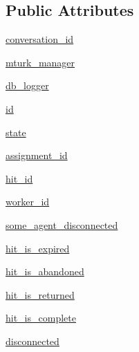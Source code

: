 \subsection*{Public Attributes}
\begin{DoxyCompactItemize}
\item 
\hyperlink{classparlai_1_1mturk_1_1core_1_1agents_1_1MTurkAgent_aa3127b5ca4b6da4227b7e7a1e79b7f48}{conversation\+\_\+id}
\item 
\hyperlink{classparlai_1_1mturk_1_1core_1_1agents_1_1MTurkAgent_ae3fddc0185f75ea64b09a86628d4a1d1}{mturk\+\_\+manager}
\item 
\hyperlink{classparlai_1_1mturk_1_1core_1_1agents_1_1MTurkAgent_ae5f9e297a7b8cc7f70286dfbb099ed64}{db\+\_\+logger}
\item 
\hyperlink{classparlai_1_1mturk_1_1core_1_1agents_1_1MTurkAgent_a88ae98b0e8133e9fff2475d09a6f2a81}{id}
\item 
\hyperlink{classparlai_1_1mturk_1_1core_1_1agents_1_1MTurkAgent_aa07fbe6a898e37332826c2d414539a34}{state}
\item 
\hyperlink{classparlai_1_1mturk_1_1core_1_1agents_1_1MTurkAgent_ada9c2a6ca3ee222f73743b2bc3a9d85f}{assignment\+\_\+id}
\item 
\hyperlink{classparlai_1_1mturk_1_1core_1_1agents_1_1MTurkAgent_a4325d1370d25335d4a7ad279d7d0c615}{hit\+\_\+id}
\item 
\hyperlink{classparlai_1_1mturk_1_1core_1_1agents_1_1MTurkAgent_a88699f19c4c7e658ae0424062cbb9d80}{worker\+\_\+id}
\item 
\hyperlink{classparlai_1_1mturk_1_1core_1_1agents_1_1MTurkAgent_a366ba925ed5b785fb44cbfe4a47e6739}{some\+\_\+agent\+\_\+disconnected}
\item 
\hyperlink{classparlai_1_1mturk_1_1core_1_1agents_1_1MTurkAgent_ad5ef0e410b5e61c592d69dc4187037b2}{hit\+\_\+is\+\_\+expired}
\item 
\hyperlink{classparlai_1_1mturk_1_1core_1_1agents_1_1MTurkAgent_ababed43ee0e082b71a7b73c82de44782}{hit\+\_\+is\+\_\+abandoned}
\item 
\hyperlink{classparlai_1_1mturk_1_1core_1_1agents_1_1MTurkAgent_a8f4078973bf1552910cf77773f00cd4c}{hit\+\_\+is\+\_\+returned}
\item 
\hyperlink{classparlai_1_1mturk_1_1core_1_1agents_1_1MTurkAgent_a0c5cd20df0106fd8f6605f03b6654ede}{hit\+\_\+is\+\_\+complete}
\item 
\hyperlink{classparlai_1_1mturk_1_1core_1_1agents_1_1MTurkAgent_ad371cc18056672682b640deb702bc444}{disconnected}
\item 

\end{DoxyCompactItemize}
